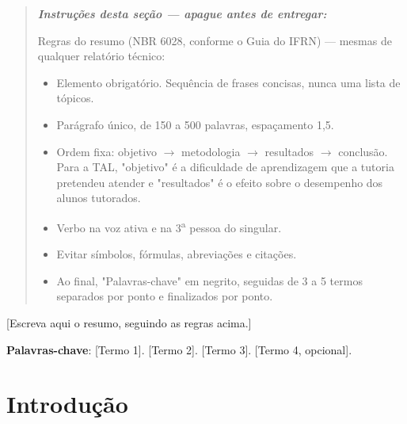 \documentclass[article,12pt,a4paper]{abntex2}
\newenvironment{instrucoes}{%
  \begin{quotation}\footnotesize\itshape
  \noindent\textbf{\upshape Instruções desta seção — apague antes de entregar:}\par\smallskip
}{%
  \end{quotation}
}
\begin{document}
\maketitle

\begin{resumo}
\begin{instrucoes}
Regras do resumo (NBR 6028, conforme o Guia do IFRN) — mesmas de qualquer relatório técnico:
\begin{itemize}
  \item Elemento obrigatório. Sequência de frases concisas, nunca uma lista de tópicos.
  \item Parágrafo único, de 150 a 500 palavras, espaçamento 1,5.
  \item Ordem fixa: objetivo $\to$ metodologia $\to$ resultados $\to$ conclusão. Para a TAL, "objetivo" é a dificuldade de aprendizagem que a tutoria pretendeu atender e "resultados" é o efeito sobre o desempenho dos alunos tutorados.
  \item Verbo na voz ativa e na 3\textsuperscript{a} pessoa do singular.
  \item Evitar símbolos, fórmulas, abreviações e citações.
  \item Ao final, "Palavras-chave" em negrito, seguidas de 3 a 5 termos separados por ponto e finalizados por ponto.
\end{itemize}
\end{instrucoes}

[Escreva aqui o resumo, seguindo as regras acima.]

\vspace{\onelineskip}
\noindent
\textbf{Palavras-chave}: [Termo 1]. [Termo 2]. [Termo 3]. [Termo 4, opcional].
\end{resumo}

\textual

\section{Introdução}
\end{document}

